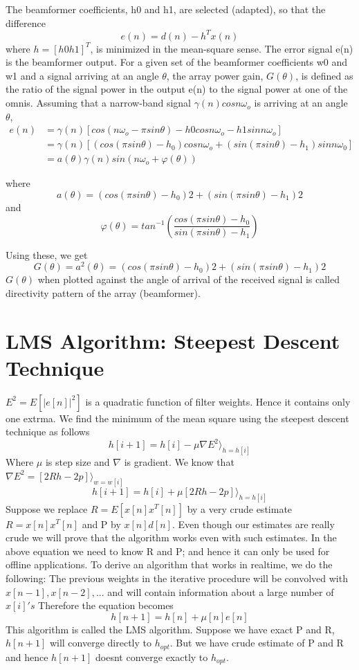 The beamformer coefficients, h0 and h1, are selected (adapted), so that the difference
$$e(n) = d(n) − h^Tx(n)$$
where $h = [h0 h1]^T$, is minimized in the mean-square sense. The error signal e(n) is the
beamformer output.
For a given set of the beamformer coefficients w0 and w1 and a signal arriving at an
angle $\theta$, the array power gain, $G(\theta)$, is defined as the ratio of the signal power in the
output e(n) to the signal power at one of the omnis. Assuming that a narrow-band signal
$\gamma (n) cos n\omega_o$ is arriving at an angle $\theta$,
\begin{align*}
e(n) &= \gamma (n)[cos(n\omega_o − \pi sin \theta) − h0 cos n\omega_o − h1 sin n\omega_o]\\
&= \gamma (n)[(cos(\pi sin \theta) − h_0) cos n\omega_o + (sin(\pi sin \theta) − h_1) sin n\omega_0]\\
&= a(\theta)\gamma (n) sin(n\omega_o+ \varphi(\theta))
\end{align*}

where
$$a(\theta) = (cos(\pi sin \theta) − h_0)2 + (sin(\pi sin \theta) − h_1)2$$
and
$$\varphi(\theta) = tan^{−1}(\frac{cos(\pi sin \theta) − h_0}{sin(\pi sin \theta) − h_1}) $$


Using these, we get
$$G(\theta) = a^2(\theta) = (cos(\pi sin \theta) − h_0)2 + (sin(\pi sin \theta) − h_1)2$$
$G(\theta)$ when plotted against the angle of arrival of the received signal is called directivity
pattern of the array (beamformer).



\section{LMS Algorithm: Steepest Descent Technique}
$E^{2}=E[ |e[n]|^2]$ is a quadratic function of filter weights. Hence it contains only one extrma. We find the minimum of the mean square using the steepest descent technique as follows
$$ h[i+1] = h[i] - \mu\nabla E^{2} \Big \rangle _{h=h[i]}$$
Where $\mu$ is step size and $\nabla$ is gradient. 
We know that $\nabla E^{2}=[2Rh-2p]\Big \rangle _{w=w[i]}$
$$  h[i+1] = h[i] + \mu[2Rh-2p]\Big \rangle _{h=h[i]}$$
Suppose we replace $R=E[x[n]x^T[n]]$ by a very crude estimate $R=x[n]x^T[n]$ and P by $x[n]d[n]$.
Even though our estimates are really crude we will prove that the algorithm works even with such estimates.
In the above equation we need to know R and P; and hence it can only be used for offline applications. To derive an algorithm that works in realtime, we do the following: 
The previous weights in the iterative procedure will be convolved with $x[n-1],x[n-2],...$ and will contain information about a large number of $x[i]'s$
Therefore the equation becomes 
$$  h[n+1] = h[n] + \mu[n]e[n] $$
This algorithm is called the LMS algorithm.
Suppose we have exact P and R, $h[n+1]$ will converge directly to $h_{opt}$.
But we have crude estimate of P and R and hence $h[n+1]$ doesnt converge exactly to $h_{opt}$.

